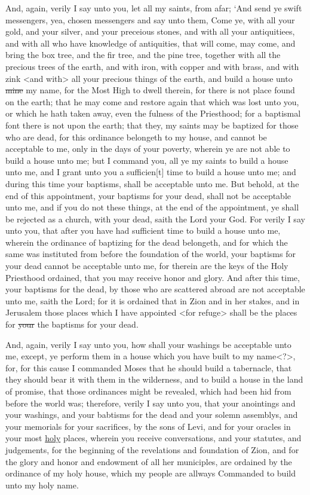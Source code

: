 				And, again, verily I say unto you, let all my saints, from afar; `And send ye swift messengers, yea, chosen messengers and say unto them, Come ye, with all your gold, and your silver, and your preceious stones, and with all your antiquitiees, and with all who have knowledge of antiquities, that will come, may come, and bring the box tree, and the fir tree, and the pine tree, together with all the precious trees of the earth, and with iron, with copper and with brass, and with zink <and with> all your precious things of the earth, and build a house unto \sout{mine} my name, for the Most High to dwell therein, for there is not place found on the earth; that he may come and restore again that which was lost unto you, or which he hath taken away, even the fulness of the Priesthood; for a baptismal font there is not upon the earth; that they, my saints may be baptized for those who are dead, for this ordinance belongeth to my house, and cannot be acceptable to me, only in the days of your poverty, wherein ye are not able to build a house unto me; but I command you, all ye my saints to build a house unto me, and I grant unto you a sufficien[t] time to build a house unto me; and during this time your baptisms, shall be acceptable unto me. But behold, at the end of this appointment, your baptisms for your dead, shall not be acceptable unto me, and if you do not these things, at the end of the appointment, ye shall be rejected as a church, with your dead, saith the Lord your God. For verily I say unto you, that after you have had sufficient time to build a house unto me, wherein the ordinance of baptizing for the dead belongeth, and for which the same was instituted from before the foundation of the world, your baptisms for your dead cannot be acceptable unto me, for therein are the keys of the Holy Priesthood ordained, that you may receive honor and glory. And after this time, your baptisms for the dead, by those who are scattered abroad are not acceptable unto me, saith the Lord; for it is ordained that in Zion and in her stakes, and in Jerusalem those places which I have appointed <for refuge> shall be the places for \sout{your} the baptisms for your dead.

				And, again, verily I say unto you, how shall your washings be acceptable unto me, except, ye perform them in a house which you have built to my name<?>, for, for this cause I commanded Moses that he should build a tabernacle, that they should bear it with them in the wilderness, and to build a house in the land of promise, that those ordinances might be revealed, which had been hid from before the world was; therefore, verily I say unto you, that your anointings and your washings, and your babtisms for the dead and your solemn assemblys, and your memorials for your sacrifices, by the sons of Levi, and for your oracles in your most \uline{holy} places, wherein you receive conversations, and your statutes, and judgements, for the beginning of the revelations and foundation of Zion, and for the glory and honor and endowment of all her municiples, are ordained by the ordinance of my holy house, which my people are allways Commanded to build unto my holy name.

